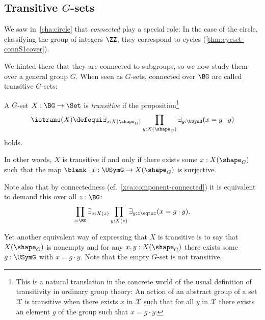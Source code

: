\subsection{Transitive $G$-sets}
\label{sec:transitiveGsets}
We saw in~\cref{cha:circle} that \emph{connected \coverings}
play a special role:
In the case of the circle, classifying the group of integers $\ZZ$,
they correspond to cycles (\cref{thm:cycset-connS1cover}).

We hinted there that they are connected to subgroups, so
we now study them over a general group $G$.
When seen as $G$-sets, connected \coverings over $\BG$ are called transitive $G$-sets:
\begin{definition}\label{def:transitiveGset}
  A $G$-set $X:\BG\to\Set$ is \emph{transitive} if the proposition\footnote{This is a natural translation in the concrete world of the usual definition of transitivity in ordinary group theory: An action of an abstract group of a set $\mathcal X$ is transitive when there exists $x$ in $\mathcal X$ such that for all $y$ in $\mathcal X$ there exists an element $g$ of the group such that $x=g\cdot y$.}
  \[
    \istrans(X) \defequi
    \exists_{x:X(\sh_G)} \prod_{y:X(\sh_G)} \exists_{g:\USymG} (x=g\cdot y)
  \]
  holds.
\end{definition}
\begin{remark}
  In other words, $X$ is transitive if and only if there exists
  some $x:X(\sh_G)$ such that the map $\blank\cdot x:\USymG\to X(\sh_G)$ is
  surjective.

  Note also that by connectedness (cf.~\cref{xca:component-connected})
  it is equivalent to demand this over all $z:\BG$:
  \begin{equation}\label{eq:Gset-trans-gen}
    \prod_{z:\BG}\exists_{x:X(z)}
    \prod_{y:X(z)}\exists_{g:z\eqto z}(x=g\cdot y).
  \end{equation}

  Yet another equivalent way of expressing that $X$ is transitive is to say
  that $X(\sh_G)$ is nonempty and for any $x,y:X(\sh_G)$ there
  exists some $g:\USymG$ with $x = g\cdot y$.
  Note that the empty $G$-set is not transitive.
\end{remark}

